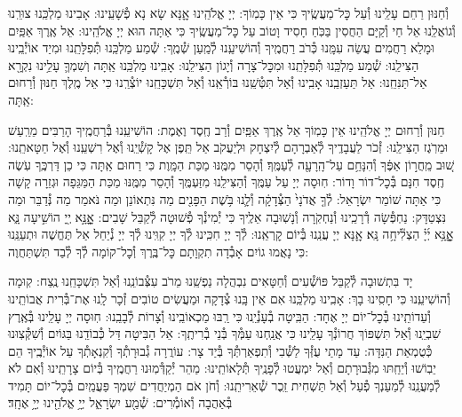 \documentclass[twoside, openany, parskip=half, 11pt]{book}
\begin{document}
וְ֯חַנּוּן רַחֵם עָלֵֽינוּ וְ֯עַל כׇּל־מַעֲשֶֽׂיךָ כִּי אֵין כָּמֽוֹךָ: יְיָ אֱלֹהֵֽינוּ אׇׇנָּא שָׂא נָא פְ֯שָׁעֵֽינוּ: אָבִינוּ מַלְכֵּֽנוּ צוּרֵֽנוּ וְ֯גוֹאֲלֵֽנוּ אֵל חַי וְ֯קַיָּם הַחֲסִין בַּכֹּֽחַ חָסִיד וָטוֹב עַל כׇּל־מַעֲשֶֽׂיךָ כִּי אַתָּה הוּא יְיָ אֱלֹהֵֽינוּ: אֵל אֶֽרֶךְ אַפַּֽיִם וּמָלֵא רַחֲמִים עֲשֵׂה עִמָּֽנוּ כְּ֯רֹב רַחֲמֶֽיךָ וְ֯הוֹשִׁיעֵֽנוּ לְ֯מַֽעַן שְׁ֯מֶֽךָ: שְׁ֯מַע מַלְכֵּֽנוּ תְּ֯פִלָּתֵֽנוּ וּמִיַד אוֹיְ֯בֵֽינוּ הַצִּילֵֽנוּ: שְׁ֯מַע מַלְכֵּֽנוּ תְּ֯פִלָּתֵֽנוּ וּמִכׇּל־צָרָה וְ֯יָגוֹן הַצִּילֵֽנוּ: אָבִֽינוּ מַלְכֵּֽנוּ אַֽתָּה וְשִׁמְךָ֛ עָלֵ֥ינוּ נִקְרָ֖א אַל־תַּנִּחֵֽנוּ: אַל תַּעַזְבֵֽנוּ אָבִֽינוּ וְ֯אַל תִּטְּ֯שֵֽׁנוּ בּוֹרְ֯אֵֽנוּ וְ֯אַל תִּשְׁכָּחֵֽנוּ יוֹצְ֯רֵֽנוּ כִּי אֵל מֶֽלֶךְ חַנּוּן וְ֯רַחוּם אַֽתָּה:



חַנּוּן וְ֯רַחוּם יְיָ אֱלֹהֵֽינוּ אֵין כָּמֽוֹךָ אֵל אֶֽרֶךְ אַפַּֽיִם וְ֯רַב חֶֽסֶד וֶאֶמֶת: הוֹשִׁיעֵֽנוּ בְּ֯רַחֲמֶֽיךָ הָרַבִּים מֵרַֽעַשׁ וּמֵרֹֽגֶז הַצִּילֵֽנוּ: זְ֯כֹר לַעֲבָדֶֽיךָ לְ֯אַבְרָהָם לְ֯יִצְחָק וּלְיַעֲקֹב אַל תֵּֽפֶן אֶל קָשְׁ֯יֵֽנוּ וְ֯אֶל רִשְׁעֵֽנוּ וְ֯אֶל חַטָּאתֵֽנוּ:
שׁ֚וּב מֵֽחֲר֣וֹן אַפֶּ֔ךָ וְ֯הִנָּחֵ֥ם עַל־הָֽרָעָ֖ה לְ֯עַמֶּֽךָ׃ וְ֯הָסֵר מִמֶּֽנּוּ מַכַּת הַמָּֽוֶת כִּי רַחוּם אַֽתָּה כִּי כֵן דַּרְכֶּֽךָ עֹֽשֶׂה חֶֽסֶד חִנָּם בְּ֯כׇל־דוֹר וָדוֹר: חֽוּסָה יְיָ עַל עַמֶּֽךָ וְ֯הַצִּילֵֽנוּ מִזַּעְמֶּֽךָ וְ֯הָסֵר מִמֶּֽנּוּ מַכַּת הַמַּגֵּפָה וּגְזֵרָה קָשָׁה כִּי אַתָּה שׁוֹמֵר יִשְׂרָאֵל:
לְ֯ךָ֤ אֲדֹנָי֙ הַצְּ֯דָקָ֔ה וְ֯לָ֛נוּ בֹּ֥שֶׁת הַפָּנִ֖ים מַה נִּתְאוֹנֵן וּמַה נֹּאמַר מַה נְּ֯דַבֵּר וּמַה נִּצְטַדָּק: נַחְפְּ֯שָׂה דְ֯רָכֵֽינוּ וְ֯נַחְקֹֽרָה וְ֯נָשֽׁוּבָה אֵלֶֽיךָ כִּי יְ֯מִינְ֯ךָ פְ֯שׁוּטָה לְ֯קַבֵּל שָׁבִים:
אׇׇׇׇֽנָּ֣א יְ֖יָ הוֹשִׁ֣יעָה נָּ֑א אׇׇׇׇֽנָּ֥א יְ֜יָ֗ הַצְלִ֘יחָ֥ה נָּֽא׃ אׇׇנָּא יְיָ עֲנֵֽנוּ בְּ֯יוֹם קׇרְאֵֽנוּ: לְ֯ךָ יְיָ חִכִּֽינוּ לְ֯ךָ יְיָ קִוִּֽינוּ לְ֯ךָ יְיָ נְ֯יַחֵל אַל תֶּחֱשֶׁה וּתְעַנֵּֽנוּ כִּי נָאֲמוּ גוֹיִם אָבְ֯דָה תִקְוָתָם כׇּל־בֶּֽרֶךְ וְ֯כׇל־קוֹמָה לְ֯ךָ לְ֯בַד תִּשְׁתַּחֲוֶה:

יָד בִּתְשׁוּבָה לְ֯קַבֵּל פּוֹשְׁ֯עִים וְ֯חַטָּאִים נִבְהֲלָה נַפְשֵֽׁנוּ מֵרֹב עִצְּ֯בוֹנֵֽנוּ וְ֯אַל תִּשְׁכָּחֵֽנוּ נֶֽצַח: קֽוּמָה וְ֯הוֹשִׁיעֵֽנוּ כִּי חָסִֽינוּ בָךְ: אָבִֽינוּ מַלְכֵּֽנוּ אִם אֵין בָּֽנוּ צְ֯דָקָה וּמַעֲשִׂים טוֹבִים זְ֯כָר לָֽנוּ אֶת־בְּ֯רִית אֲבוֹתֵֽינוּ וְ֯עֵדוֹתֵֽינוּ בְּ֯כׇל־יוֹם יְיָ אֶחָד: הַבִּֽיטָה בְ֯עָנְ֯יֵֽנוּ כִּי רַֽבּוּ מַכְאוֹבֵֽינוּ וְ֯צָרוֹת לְ֯בָבֵֽנוּ: חֽוּסָה יְיָ עָלֵֽינוּ בְּ֯אֶֽרֶץ שִׁבְיֵֽנוּ וְ֯אַל תִּשְׁפּוֹךְ חֲרוֹנְ֯ךָ עָלֵֽינוּ כִּי אֲנַֽחְנוּ עַמְּ֯ךָ בְּ֯נֵי בְ֯רִיתֶֽךָ: אֵל הַבִּיטָה דַּל כְּ֯בוֹדֵֽנוּ בַּגּוֹיִם וְ֯שִׁקְּ֯צֽוּנוּ כְּ֯טֻמְאַת הַנִּדָּה: עַד מָתַי עֻזְּ֯ךָ לַשְּׁ֯בִי וְ֯תִפְאַרְתְּ֯ךָ בְּ֯יַד צָר: עוֹרֲרָה גְ֯בוּרָתְ֯ךָ וְ֯קִנְאָתְ֯ךָ עַל אוֹיְ֯בֶֽיךָ הֵם יֵבֽוֹשׁוּ וְ֯יֵחַֽתּוּ מִגְּ֯בוּרָתָם וְ֯אַל יִמְעֲטוּ לְ֯פָנֶֽיךָ תְּ֯לָאוֹתֵֽינוּ: מַהֵר יְ֯קַדְּ֯מֽוּנוּ רַחֲמֶֽיךָ בְּ֯יוֹם צָרָתֵֽינוּ וְ֯אִם לֹא לְ֯מַעֲנֵֽנוּ לְ֯מַעַנְךָ פְ֯עַל וְ֯אַל תַּשְׁחִית זֵֽכֶר שְׁ֯אֵרִיתֵֽנוּ: וְ֯חֹן אֹם הַמְיַחֲדִים שִׁמְךָ פַּעֲמַֽיִם בְּ֯כׇל־יוֹם תָּמִיד בְּ֯אַהֲבָה וְ֯אוֹמְ֯רִים:
שְׁ֯מַ֖ע יִשְׂרָאֵ֑ל יְיָ֥ אֱלֹהֵ֖ינוּ יְיָ֥ אֶחָֽד׃
\end{document}
